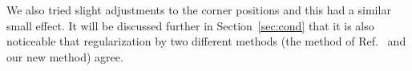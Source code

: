 We also tried slight adjustments to the corner positions and this had a
similar small effect.  It will be discussed further in
Section~\ref{sec:cond} that it is also noticeable that regularization
by two different methods (the method of Ref.~\cite{bea}
and our new method) agree.





